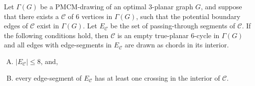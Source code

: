 \begin{lemma}
Let $\Gamma(G)$ be a PMCM-drawing of an optimal $3$-planar graph $G$, and suppose that there exists a \pp $\mathcal{C}$ of $6$ vertices in $\Gamma(G)$, such that the potential boundary edges of $\mathcal{C}$ exist in $\Gamma(G)$. Let $E_{\mathcal{C}}$ be the set of passing-through segments of $\mathcal{C}$. If the following conditions hold, then $\mathcal{C}$ is an empty true-planar $6$-cycle in $\Gamma(G)$ and all edges with edge-segments in $E_{\mathcal{C}}$ are drawn as chords in its interior.
\begin{enumerate}[C.1:]
\item \label{cnd:1} $|E_{\mathcal{C}}|\leq 8$, and, 
\item \label{cnd:2} every edge-segment of $E_{\mathcal{C}}$ has at least one crossing in the interior of $\mathcal{C}$.
\end{enumerate}
\label{lem:size9}
\end{lemma}

